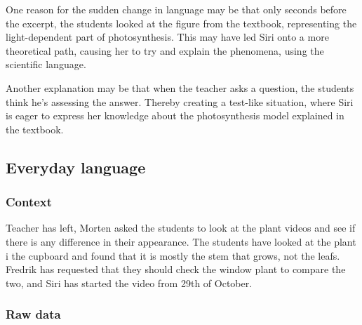 One reason for the sudden change in language may be that only seconds before the excerpt, the students looked at the figure from the textbook, representing the light-dependent part of photosynthesis. This may have led Siri onto a more theoretical path, causing her to try and explain the phenomena, using the scientific language. 

Another explanation may be that when the teacher asks a question, the students think he's assessing the answer. Thereby creating a test-like situation, where Siri is eager to express her knowledge about the photosynthesis model explained in the textbook. 



\subsection{Everyday language}


\subsubsection*{Context}
Teacher has left, Morten asked the students to look at the plant videos and see if there is any difference in their appearance. The students have looked at the plant i the cupboard and found that it is mostly the stem that grows, not the leafs. Fredrik has requested that they should check the window plant to compare the two, and Siri has started the video from 29th of October.


\subsubsection*{Raw data}

